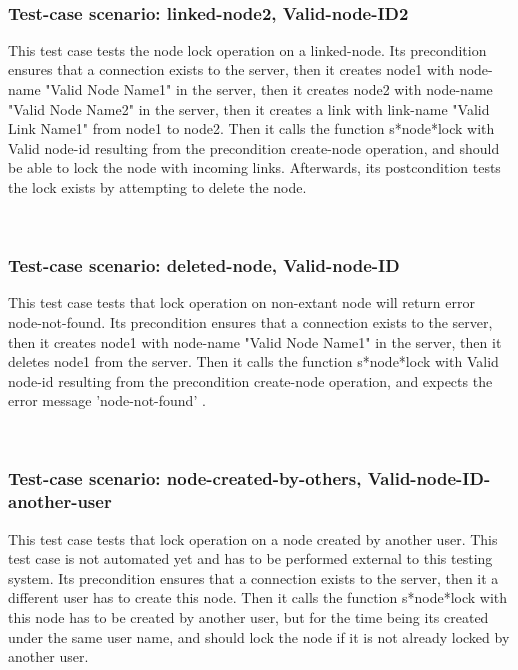 \
\subsubsection {Test-case scenario: linked-node2, Valid-node-ID2}


This test case tests the node lock operation on a linked-node.
Its precondition ensures that a connection exists to the server, then it creates node1 with node-name "Valid Node Name1" in the server, then it creates node2 with node-name  "Valid Node Name2" in the server, then it creates a link with link-name "Valid Link Name1" from node1 to node2.
Then it calls the function s*node*lock  with Valid node-id resulting from the precondition create-node operation, and should be able to lock the node with incoming links.
Afterwards, its postcondition tests the lock exists by attempting to delete the node.




\
\subsubsection {Test-case scenario: deleted-node, Valid-node-ID}


This test case tests that lock operation on non-extant node will return error node-not-found.
Its precondition ensures that a connection exists to the server, then it creates node1 with node-name "Valid Node Name1" in the server, then it deletes node1 from the server.
Then it calls the function s*node*lock  with Valid node-id resulting from the precondition create-node operation, and expects the error message 'node-not-found' .





\
\subsubsection {Test-case scenario: node-created-by-others, Valid-node-ID-another-user}


This test case tests that lock operation on a node created by another user.  This test case is not automated yet and has to be performed external to this testing system.
Its precondition ensures that a connection exists to the server, then it a different user has to create this node.
Then it calls the function s*node*lock  with this node has to be created by another user, but for the time being its created under the same user name, and should lock the node if it is not already locked by another user.



